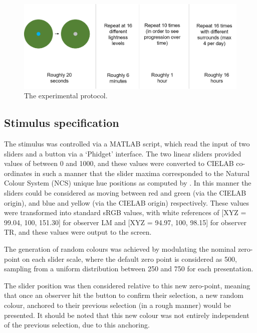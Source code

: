 \begin{figure}[htbp]
\includegraphics[max width=\textwidth]{figs/LargeSphere/ExperimentalPro.png}
\caption{The experimental protocol.}
\label{fig:ExperimentalPro}
\end{figure}

\subsection{Stimulus specification}
\label{sec:LSstim}

The stimulus was controlled via a MATLAB script, which read the input of two sliders and a button via a `Phidget' interface. The two linear sliders provided values of between 0 and 1000, and these values were converted to CIELAB co-ordinates in such a manner that the slider maxima corresponded to the Natural Colour System (NCS) unique hue positions as computed by \citet{derefeldt_transformation_1986}. In this manner the sliders could be considered as moving between red and green (via the CIELAB origin), and blue and yellow (via the CIELAB origin) respectively. These values were transformed into standard sRGB values, with white references of [XYZ = 99.04, 100, 151.30] for observer LM and [XYZ = 94.97, 100, 98.15] for observer TR, and these values were output to the screen.

The generation of random colours was achieved by modulating the nominal zero-point on each slider scale, where the default zero point is considered as 500, sampling from a uniform distribution between 250 and 750 for each presentation. 

The slider position was then considered relative to this new zero-point, meaning that once an observer hit the button to confirm their selection, a new random colour, anchored to their previous selection (in a rough manner) would be presented. It should be noted that this new colour was not entirely independent of the previous selection, due to this anchoring.


